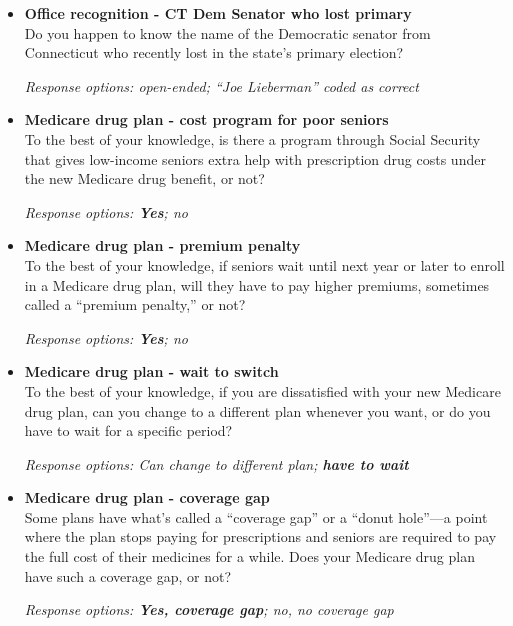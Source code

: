 \documentclass[12pt, letterpaper]{article}
\begin{document}
\begin{itemize}
\item \textbf{Office recognition - CT Dem Senator who lost primary}\\
Do you happen to know the name of the Democratic senator from Connecticut who recently lost in the state's primary election?

\textit{Response options: open-ended; ``Joe Lieberman'' coded as correct} 
\end{itemize}

\begin{itemize}
\item \textbf{Medicare drug plan - cost program for poor seniors}\\
To the best of your knowledge, is there a program through Social Security that gives low-income seniors extra help with prescription drug costs under the new Medicare drug benefit, or not? 

\textit{Response options: \textbf{Yes}; no} 
\end{itemize}

\begin{itemize}
\item \textbf{Medicare drug plan - premium penalty}\\
To the best of your knowledge, if seniors wait until next year or later to enroll in a Medicare drug plan, will they have to pay higher premiums, sometimes called a ``premium penalty,'' or not?

\textit{Response options: \textbf{Yes}; no} 
\end{itemize}

\begin{itemize}
\item \textbf{Medicare drug plan - wait to switch}\\
To the best of your knowledge, if you are dissatisfied with your new Medicare drug plan, can you change to a different plan whenever you want, or do you have to wait for a specific period?

\textit{Response options: Can change to different plan; \textbf{have to wait}} 
\end{itemize}

\begin{itemize}
\item \textbf{Medicare drug plan - coverage gap}\\
Some plans have what's called a ``coverage gap'' or a ``donut hole''---a point where the plan stops paying for prescriptions and seniors are required to pay the full cost of their medicines for a while. Does your Medicare drug plan have such a coverage gap, or not?

\textit{Response options: \textbf{Yes, coverage gap}; no, no coverage gap} 
\end{itemize}
\end{document}
